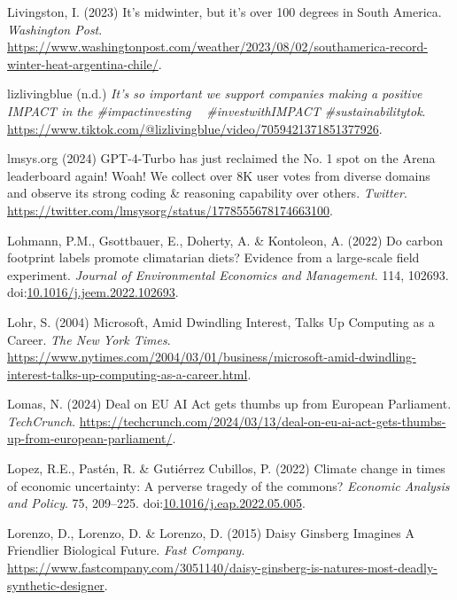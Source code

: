 \documentclass[
  letterpaper,
  DIV=11,
  numbers=noendperiod]{scrartcl}
\newlength{\cslhangindent}
\newenvironment{CSLReferences}[2] %
 {\begin{list}{}{%
  \setlength{\itemindent}{0pt}
  \setlength{\leftmargin}{0pt}
  \setlength{\parsep}{0pt}
  \ifodd #1
   \setlength{\leftmargin}{\cslhangindent}
   \setlength{\itemindent}{-1\cslhangindent}
  \fi
  \setlength{\itemsep}{#2\baselineskip}}}
 {\end{list}}
\begin{document}
\begin{CSLReferences}{0}{1}
Livingston, I. (2023) It's midwinter, but it's over 100 degrees in
{South America}. \emph{Washington Post}.
\url{https://www.washingtonpost.com/weather/2023/08/02/southamerica-record-winter-heat-argentina-chile/}.

lizlivingblue (n.d.) \emph{It's so important we support companies making
a positive {IMPACT} in the \#impactinvesting 💚💸 \#{investwithIMPACT}
\#sustainabilitytok}.
\url{https://www.tiktok.com/@lizlivingblue/video/7059421371851377926}.

lmsys.org (2024) {GPT-4-Turbo} has just reclaimed the {No}. 1 spot on
the {Arena} leaderboard again! {Woah}! {We} collect over {8K} user votes
from diverse domains and observe its strong coding \& reasoning
capability over others. \emph{Twitter}.
\url{https://twitter.com/lmsysorg/status/1778555678174663100}.

Lohmann, P.M., Gsottbauer, E., Doherty, A. \& Kontoleon, A. (2022) Do
carbon footprint labels promote climatarian diets? {Evidence} from a
large-scale field experiment. \emph{Journal of Environmental Economics
and Management}. 114, 102693.
doi:\href{https://doi.org/10.1016/j.jeem.2022.102693}{10.1016/j.jeem.2022.102693}.

Lohr, S. (2004) Microsoft, {Amid Dwindling Interest}, {Talks Up
Computing} as a {Career}. \emph{The New York Times}.
\url{https://www.nytimes.com/2004/03/01/business/microsoft-amid-dwindling-interest-talks-up-computing-as-a-career.html}.

Lomas, N. (2024) Deal on {EU AI Act} gets thumbs up from {European
Parliament}. \emph{TechCrunch}.
\url{https://techcrunch.com/2024/03/13/deal-on-eu-ai-act-gets-thumbs-up-from-european-parliament/}.

Lopez, R.E., Pastén, R. \& Gutiérrez Cubillos, P. (2022) Climate change
in times of economic uncertainty: {A} perverse tragedy of the commons?
\emph{Economic Analysis and Policy}. 75, 209--225.
doi:\href{https://doi.org/10.1016/j.eap.2022.05.005}{10.1016/j.eap.2022.05.005}.

Lorenzo, D., Lorenzo, D. \& Lorenzo, D. (2015) Daisy {Ginsberg Imagines
A Friendlier Biological Future}. \emph{Fast Company}.
\url{https://www.fastcompany.com/3051140/daisy-ginsberg-is-natures-most-deadly-synthetic-designer}.


\end{CSLReferences}
\end{document}
